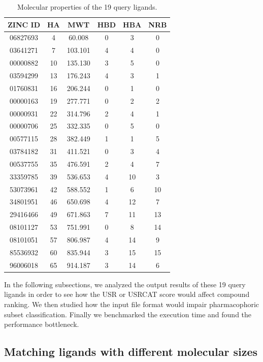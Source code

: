 \begin{table}
\caption{Molecular properties of the 19 query ligands.}
\label{usr:Queries}
\begin{tabular}{cccccc}
\hline
ZINC ID  & HA & MWT & HBD & HBA & NRB\\
\hline
06827693 &  4 &  60.008 & 0 &  3 &  0\\
03641271 &  7 & 103.101 & 4 &  4 &  0\\
00000882 & 10 & 135.130 & 3 &  5 &  0\\
03594299 & 13 & 176.243 & 4 &  3 &  1\\
01760831 & 16 & 206.244 & 0 &  1 &  0\\
00000163 & 19 & 277.771 & 0 &  2 &  2\\
00000931 & 22 & 314.796 & 2 &  4 &  1\\
00000706 & 25 & 332.335 & 0 &  5 &  0\\
00577115 & 28 & 382.449 & 1 &  1 &  5\\
03784182 & 31 & 411.521 & 0 &  3 &  4\\
00537755 & 35 & 476.591 & 2 &  4 &  7\\
33359785 & 39 & 536.653 & 4 & 10 &  3\\
53073961 & 42 & 588.552 & 1 &  6 & 10\\
34801951 & 46 & 650.698 & 4 & 12 &  7\\
29416466 & 49 & 671.863 & 7 & 11 & 13\\
08101127 & 53 & 751.991 & 0 &  8 & 14\\
08101051 & 57 & 806.987 & 4 & 14 &  9\\
85536932 & 60 & 835.944 & 3 & 15 & 15\\
96006018 & 65 & 914.187 & 3 & 14 &  6\\
\hline
\end{tabular}
\end{table}

In the following subsections, we analyzed the output results of these 19 query ligands in order to see how the USR or USRCAT score would affect compound ranking. We then studied how the input file format would impair pharmacophoric subset classification. Finally we benchmarked the execution time and found the performance bottleneck.

\subsection{Matching ligands with different molecular sizes}

